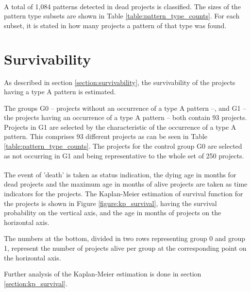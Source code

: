 \paragraph{}
A total of 1,084 patterns detected in dead projects is classified. The sizes of
the pattern type subsets are shown in Table \ref{table:pattern_type_counts}.
For each subset, it is stated in how many projects a pattern of that type was
found.



\section{Survivability}
As described in section \ref{section:survivability}, the survivability of the
projects having a type A pattern is estimated.

The groups G0 -- projects without an occurrence of a type A pattern --, and G1
-- the projects having an occurrence of a type A pattern -- both contain 93
projects. Projects in G1 are selected by the characteristic of the occurrence
of a type A pattern. This comprises 93 different projects as can be seen in
Table \ref{table:pattern_type_counts}. The projects for the control group G0
are selected as not occurring in G1 and being representative to the whole set
of 250 projects.

\paragraph{}
The event of 'death' is taken as status indication, the dying age in months for
dead projects and the maximum age in months of alive projects are taken as time
indicators for the projects. The Kaplan-Meier estimation of survival function
for the projects is shown in Figure \ref{figure:kp_survival}, having the
survival probability on the vertical axis, and the age in months of projects on
the horizontal axis.

The numbers at the bottom, divided in two rows representing group 0 and group
1, represent the number of projects alive per group at the corresponding point
on the horizontal axis.



\noindent
Further analysis of the Kaplan-Meier estimation is done in section
\ref{section:kp_survival}.

\begin{comment}
- Factual results
- Tables and figures for clarification

This chapter presents and clarifies the results obtained during the research.
The focus should be on the factual results, not the interpretation or
discussion. Tables and graphics should be used to increase the clarity of the
results where applicable.
Have a look at the the results chapter in this example thesis on Paul’s
homepage\footnote{http://homepages.cwi.nl/~paulk/thesesMasterSoftwareEngineering/2006/ArnoldLankamp.pdf}.
\end{comment}
